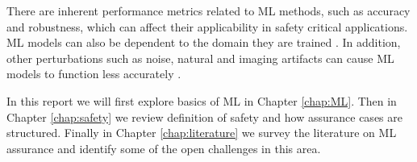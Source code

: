There are inherent performance metrics related to ML methods, such as accuracy and robustness, which can affect their applicability in safety critical applications. ML models can also be dependent to the domain they are trained \cite{Ganin2015}. In addition, other perturbations such as noise, natural and imaging artifacts can cause ML models to function less accurately \cite{Hendrycks2019}.

In this report we will first explore basics of ML in Chapter \ref{chap:ML}. Then in Chapter \ref{chap:safety} we review definition of safety and how assurance cases are structured. Finally in Chapter \ref{chap:literature} we survey the literature on ML assurance and identify some of the open challenges in this area.